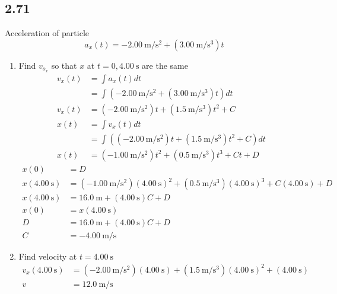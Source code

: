 \documentclass{article}
\begin{document}
\subsection{2.71}
Acceleration of particle
$$ a_x(t) = \SI{-2.00}{\meter \per \second \squared} + (\SI{3.00}{\meter \per \second \cubed})t $$
\begin{enumerate}[label=\textbf{(\alph*)}]
	\item
		Find $ v_{o_x} $ so that $ x $ at $ t = 0, \SI{4.00}{\second} $ are the same
		\begin{align*}
			v_x(t) & = \int a_x(t) dt \\
				   & = \int \left( \SI{-2.00}{\meter \per \second \squared} + (\SI{3.00}{\meter \per \second \cubed})t \right) dt \\
			v_x(t) & = (\SI{-2.00}{\meter \per \second \squared})t + (\SI{1.5}{\meter \per \second \cubed})t^2 + C \\
			x(t) & = \int v_x(t) dt \\
				 & = \int \left( (\SI{-2.00}{\meter \per \second \squared})t + (\SI{1.5}{\meter \per \second \cubed})t^2 + C \right) dt \\
			x(t) & = (\SI{-1.00}{\meter \per \second \squared})t^2 + (\SI{0.5}{\meter \per \second \cubed})t^3 + Ct + D
		\end{align*}
		\begin{align*}
			x(0) & = D \\
			x(\SI{4.00}{\second}) & = (\SI{-1.00}{\meter \per \second \squared})(\SI{4.00}{\second})^2 + (\SI{0.5}{\meter \per \second \cubed})(\SI{4.00}{\second})^3 + C(\SI{4.00}{\second}) + D \\
			x(\SI{4.00}{\second}) & = \SI{16.0}{\meter} + (\SI{4.00}{\second})C + D \\
			x(0) & = x(\SI{4.00}{\second}) \\
			D & = \SI{16.0}{\meter} + (\SI{4.00}{\second})C + D \\
			C & = \SI{-4.00}{\meter \per \second}
		\end{align*}
	\item
		Find velocity at $ t = \SI{4.00}{\second} $
		\begin{align*}
			v_x(\SI{4.00}{\second}) & = (\SI{-2.00}{\meter \per \second \squared})(\SI{4.00}{\second}) + (\SI{1.5}{\meter \per \second \cubed})(\SI{4.00}{\second})^2 + (\SI{4.00}{\second}) \\
			v & = \SI{12.0}{\meter \per \second}
		\end{align*}
\end{enumerate}
\end{document}
